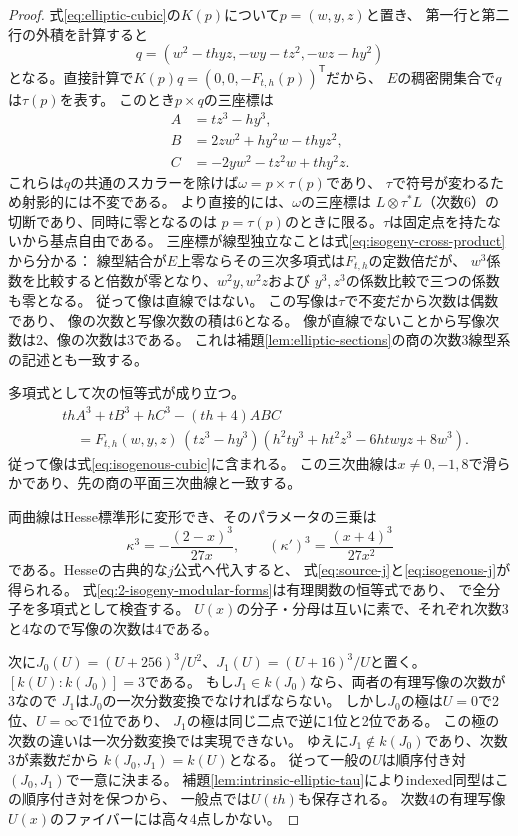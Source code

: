 \begin{proof}
式\eqref{eq:elliptic-cubic}の$K(p)$について$p=(w,y,z)$と置き、
第一行と第二行の外積を計算すると
\[
 q=(w^2-thyz,-wy-tz^2,-wz-hy^2)
\]
となる。直接計算で$K(p)q=(0,0,-F_{t,h}(p))^{\mathsf T}$だから、
$E$の稠密開集合で$q$は$\tau(p)$を表す。
このとき$p\times q$の三座標は
\begin{equation}\label{eq:isogeny-cross-product}
 \begin{aligned}
 A&=tz^3-hy^3,\\
 B&=2zw^2+hy^2w-thyz^2,\\
 C&=-2yw^2-tz^2w+thy^2z.
 \end{aligned}
\end{equation}
これらは$q$の共通のスカラーを除けば$\omega=p\times\tau(p)$であり、
$\tau$で符号が変わるため射影的には不変である。
より直接的には、$\omega$の三座標は
$L\otimes\tau^*L$（次数6）の切断であり、同時に零となるのは
$p=\tau(p)$のときに限る。$\tau$は固定点を持たないから基点自由である。
三座標が線型独立なことは式\eqref{eq:isogeny-cross-product}から分かる：
線型結合が$E$上零ならその三次多項式は$F_{t,h}$の定数倍だが、
$w^3$係数を比較すると倍数が零となり、$w^2y,w^2z$および
$y^3,z^3$の係数比較で三つの係数も零となる。
従って像は直線ではない。
この写像は$\tau$で不変だから次数は偶数であり、
像の次数と写像次数の積は6となる。
像が直線でないことから写像次数は2、像の次数は3である。
これは補題\ref{lem:elliptic-sections}の商の次数3線型系の記述とも一致する。

多項式として次の恒等式が成り立つ。
\[
\begin{split}
 &th A^3+t B^3+h C^3-(th+4)ABC\\
 &\quad=F_{t,h}(w,y,z)\,(tz^3-hy^3)
       (h^2ty^3+ht^2z^3-6htwyz+8w^3).
\end{split}
\]
従って像は式\eqref{eq:isogenous-cubic}に含まれる。
この三次曲線は$x\ne0,-1,8$で滑らかであり、先の商の平面三次曲線と一致する。

両曲線はHesse標準形に変形でき、そのパラメータの三乗は
\[
 \kappa^3=-\frac{(2-x)^3}{27x},\qquad
 (\kappa')^3=\frac{(x+4)^3}{27x^2}
\]
である。Hesseの古典的な$j$公式\cite[\S7.3, (42)]{KLV}へ代入すると、
式\eqref{eq:source-j}と\eqref{eq:isogenous-j}が得られる。
式\eqref{eq:2-isogeny-modular-forms}は有理関数の恒等式であり、
で全分子を多項式として検査する。
$U(x)$の分子・分母は互いに素で、それぞれ次数3と4なので写像の次数は4である。

次に$J_0(U)=(U+256)^3/U^2$、$J_1(U)=(U+16)^3/U$と置く。
$[k(U):k(J_0)]=3$である。
もし$J_1\in k(J_0)$なら、両者の有理写像の次数が3なので
$J_1$は$J_0$の一次分数変換でなければならない。
しかし$J_0$の極は$U=0$で2位、$U=\infty$で1位であり、
$J_1$の極は同じ二点で逆に1位と2位である。
この極の次数の違いは一次分数変換では実現できない。
ゆえに$J_1\notin k(J_0)$であり、次数3が素数だから
$k(J_0,J_1)=k(U)$となる。
従って一般の$U$は順序付き対$(J_0,J_1)$で一意に決まる。
補題\ref{lem:intrinsic-elliptic-tau}によりindexed同型はこの順序付き対を保つから、
一般点では$U(th)$も保存される。
次数4の有理写像$U(x)$のファイバーには高々4点しかない。
\end{proof}

